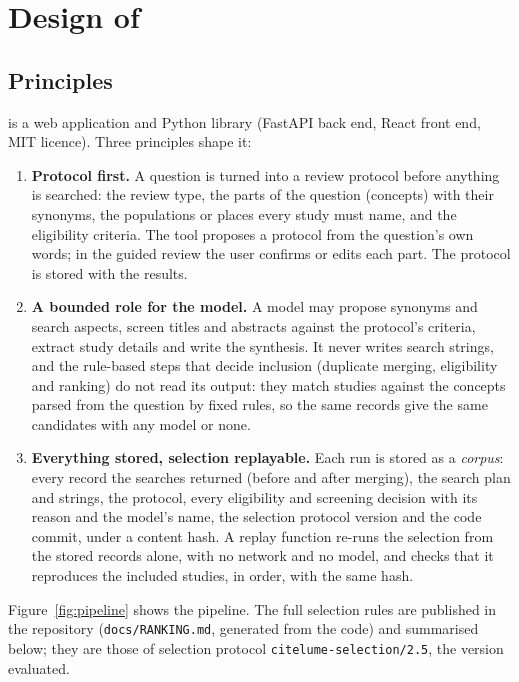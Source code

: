 \section{Design of \tool{}}
\label{sec:design}

\subsection{Principles}

\tool{} is a web application and Python library (FastAPI back end, React front end, MIT licence). Three principles
shape it:
\begin{enumerate}
\item \textbf{Protocol first.} A question is turned into a review protocol before anything is searched: the review
  type, the parts of the question (concepts) with their synonyms, the populations or places every study must name,
  and the eligibility criteria. The tool proposes a protocol from the question's own words; in the guided review
  the user confirms or edits each part. The protocol is stored with the results.
\item \textbf{A bounded role for the model.} A model may propose synonyms and search aspects, screen titles and
  abstracts against the protocol's criteria, extract study details and write the synthesis. It never writes search
  strings, and the rule-based steps that decide inclusion (duplicate merging, eligibility and ranking) do not read
  its output: they match studies against the concepts parsed from the question by fixed rules, so the same records
  give the same candidates with any model or none.
\item \textbf{Everything stored, selection replayable.} Each run is stored as a \emph{corpus}: every record the
  searches returned (before and after merging), the search plan and strings, the protocol, every eligibility and
  screening decision with its reason and the model's name, the selection protocol version and the code commit,
  under a content hash. A replay function re-runs the selection from the stored records alone, with no network
  and no model, and checks that it reproduces the included studies, in order, with the same hash.
\end{enumerate}
Figure~\ref{fig:pipeline} shows the pipeline. The full selection rules are published in the repository
(\texttt{docs/RANKING.md}, generated from the code) and summarised below; they are those of selection protocol
\texttt{citelume-selection/2.5}, the version evaluated.

